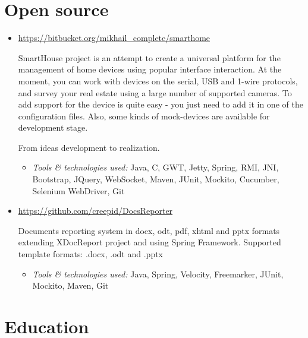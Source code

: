 \documentclass[a4paper, 12pt]{article}
\newcommand{\itemlabel}[1]{
    \textit{#1:}}
\begin{document}
\section*{Open source}  

  
    \begin{itemize}
   
        \item \href{https://bitbucket.org/mikhail_complete/smarthome/src}{https://bitbucket.org/mikhail\_complete/smarthome}

            SmartHouse project is an attempt to create a universal platform for the management of home devices using popular interface interaction. At the moment, you can work with devices on the serial, USB and 1-wire protocols, and survey your real estate using a large number of supported cameras. To add support for the device is quite easy - you just need to add it in one of the configuration files. Also, some kinds of mock-devices are available for development stage.

            From ideas development to realization.

            \begin{itemize}
                \item \itemlabel{Tools \& technologies used} Java, C, GWT, Jetty, Spring, RMI, JNI, Bootstrap, JQuery, WebSocket, Maven, JUnit, Mockito, Cucumber, Selenium WebDriver, Git
            \end{itemize}

        \item \href{https://github.com/creepid/DocsReporter}{https://github.com/creepid/DocsReporter}

            Documents reporting system in docx, odt, pdf, xhtml and pptx formats extending XDocReport project and using Spring Framework.
Supported template formats: .docx, .odt and .pptx

            \begin{itemize}
                \item \itemlabel{Tools \& technologies used} Java, Spring, Velocity, Freemarker, JUnit, Mockito, Maven, Git
            \end{itemize}
            
    \end{itemize}    

\section*{Education}
\end{document}
